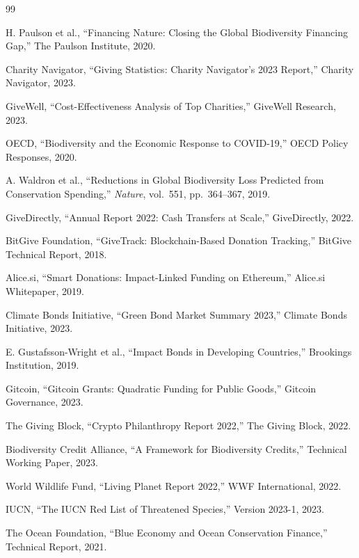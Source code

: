 \documentclass[11pt,letterpaper]{article}
\begin{document}

\begin{thebibliography}{99}

H. Paulson et al., ``Financing Nature: Closing the Global Biodiversity Financing Gap,'' The Paulson Institute, 2020.

Charity Navigator, ``Giving Statistics: Charity Navigator's 2023 Report,'' Charity Navigator, 2023.

GiveWell, ``Cost-Effectiveness Analysis of Top Charities,'' GiveWell Research, 2023.

OECD, ``Biodiversity and the Economic Response to COVID-19,'' OECD Policy Responses, 2020.

A. Waldron et al., ``Reductions in Global Biodiversity Loss Predicted from Conservation Spending,'' \emph{Nature}, vol.\ 551, pp.\ 364--367, 2019.

GiveDirectly, ``Annual Report 2022: Cash Transfers at Scale,'' GiveDirectly, 2022.

BitGive Foundation, ``GiveTrack: Blockchain-Based Donation Tracking,'' BitGive Technical Report, 2018.

Alice.si, ``Smart Donations: Impact-Linked Funding on Ethereum,'' Alice.si Whitepaper, 2019.

Climate Bonds Initiative, ``Green Bond Market Summary 2023,'' Climate Bonds Initiative, 2023.

E. Gustafsson-Wright et al., ``Impact Bonds in Developing Countries,'' Brookings Institution, 2019.

Gitcoin, ``Gitcoin Grants: Quadratic Funding for Public Goods,'' Gitcoin Governance, 2023.

The Giving Block, ``Crypto Philanthropy Report 2022,'' The Giving Block, 2022.

Biodiversity Credit Alliance, ``A Framework for Biodiversity Credits,'' Technical Working Paper, 2023.

World Wildlife Fund, ``Living Planet Report 2022,'' WWF International, 2022.

IUCN, ``The IUCN Red List of Threatened Species,'' Version 2023-1, 2023.

The Ocean Foundation, ``Blue Economy and Ocean Conservation Finance,'' Technical Report, 2021.


\end{thebibliography}
\end{document}
